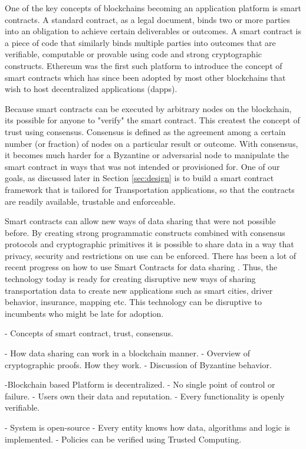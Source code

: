 One of the key concepts of blockchains becoming an application platform is smart contracts. A standard contract, as a
legal document, binds two or more parties into an obligation to achieve certain deliverables or outcomes. A smart
contract is a piece of code that similarly binds multiple parties into outcomes that are verifiable, computable or
provable using code and strong cryptographic constructs. Ethereum was the first such platform to introduce the concept
of smart contracts which has since been adopted by most other blockchains that wish to host decentralized applications
(dapps).

Because smart contracts can be executed by arbitrary nodes on the blockchain, its possible for anyone to "verify" the
smart contract. This createst the concept of trust using consensus. Consensus is defined as the agreement among a
certain number (or fraction) of nodes on a particular result or outcome. With consensus, it becomes much harder for a
Byzantine or adversarial node \cite{lamport_byz} to manipulate the smart contract in ways that was not intended or
provisioned for. One of our goals, as discussed later in Section \ref{sec:design} is to build a smart contract framework
that is tailored for Transportation applications, so that the contracts are readily available, trustable and
enforceable. 

Smart contracts can allow new ways of data sharing that were not possible before. By creating strong programmatic
constructs combined with consensus protocols and cryptographic primitives it is possible to share data in a way that
privacy, security and restrictions on use can be enforced. There has been a lot of recent progress on how to use Smart
Contracts for data sharing \cite{liu_2018}. Thus, the technology today is ready for creating disruptive new ways of
sharing transportation data to create new applications such as smart cities, driver behavior, insurance, mapping etc.
This technology can be disruptive to incumbents who might be late for adoption.

- Concepts of smart contract, trust, consensus.

- How data sharing can work in a blockchain manner. 
- Overview of cryptographic proofs. How they work.
- Discussion of Byzantine behavior.

-Blockchain based Platform is decentralized.
    - No single point of control or failure.
    - Users own their data and reputation.
    - Every functionality is openly verifiable.

- System is open-source
 - Every entity knows how data, algorithms and logic is implemented.
 - Policies can be verified using Trusted Computing.


